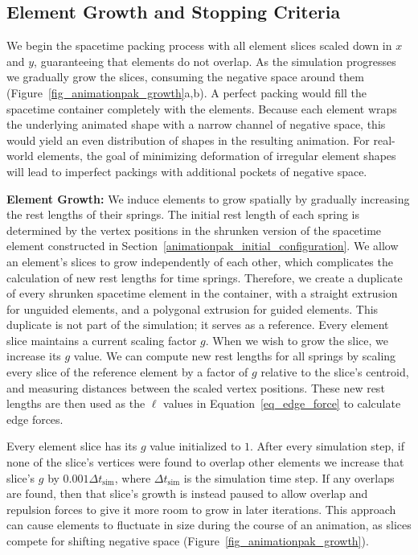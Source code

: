 \subsection{Element Growth and Stopping Criteria}
\label{animationpak_element_growth_and_stopping_criteria}



We begin the spacetime packing process with all element slices scaled
down in $x$ and $y$, guaranteeing that elements do not 
overlap.  As the simulation progresses we gradually grow the slices, 
consuming the negative space around them (Figure~\ref{fig_animationpak_growth}a,b).
A perfect packing would fill the spacetime container completely with the elements.
Because each element wraps the underlying animated shape with a narrow channel
of negative space, this would yield an even
distribution of shapes in the resulting animation.
For real-world elements, the goal of minimizing deformation of irregular 
element shapes will lead to imperfect packings with additional pockets
of negative space.


\textbf{Element Growth:}
We induce elements to grow spatially by gradually increasing the rest 
lengths of their springs.
The initial rest length of each spring is determined by the vertex positions in
the shrunken version of the spacetime element constructed in 
Section~\ref{animationpak_initial_configuration}.
We allow an element's slices to grow independently of each other, which
complicates the calculation of new rest lengths for time springs.
Therefore, we create a duplicate of every shrunken spacetime element
in the container, with a straight extrusion
for unguided elements, and a polygonal extrusion for guided elements.
This duplicate is not part of the simulation; it serves as a reference.
Every element slice maintains a current scaling factor $g$.
When we wish to grow the slice, we increase its $g$ value.
We can compute new rest lengths for all springs by scaling every slice
of the reference element by a factor of $g$ relative to the
slice's centroid, and measuring distances between the scaled vertex
positions.  These new rest lengths are then used as the $\ell$ values
in Equation~\ref{eq_edge_force} to calculate edge forces.

Every element slice has its $g$ value initialized to $1$.  After every
simulation step, if none of the slice's vertices were found to 
overlap other elements we increase that slice's $g$ by 
$0.001 \Delta t_\mathrm{sim}$, where $\Delta t_\mathrm{sim}$ is the 
simulation time step.  If any overlaps are found, then that slice's
growth is instead paused to allow overlap and repulsion forces to give it more
room to grow in later iterations.  
This approach can cause elements to fluctuate in size during the course
of an animation, as slices compete for shifting negative space 
(Figure~\ref{fig_animationpak_growth}).

